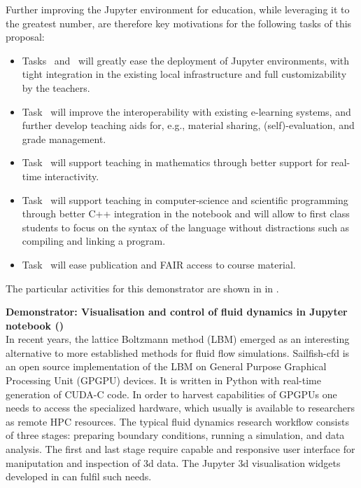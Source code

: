  Further improving the Jupyter environment for education, while
  leveraging it to the greatest number, are therefore key motivations
  for the following tasks of this proposal:
  \begin{itemize}
  \item Tasks~
    and~ will greatly ease the
    deployment of Jupyter environments, with tight integration in the
    existing local infrastructure and full customizability by the
    teachers.
  \item Task~ will improve the
    interoperability with existing e-learning systems, and further
    develop teaching aids for, e.g., material sharing,
    (self)-evaluation, and grade management.
  \item Task~ will support teaching
    in mathematics through better support for real-time interactivity.
  \item Task~ will support teaching
    in computer-science and scientific programming through
    better C++ integration in the notebook and will allow to first class students to focus on the
    syntax of the language without distractions such as compiling and
    linking a program.
  \item Task~ will ease publication and FAIR
    access to course material.
  \end{itemize}

  The particular activities for this demonstrator are shown in
   in .

\medskip
\noindent\textbf{Demonstrator: Visualisation and control of fluid dynamics in
  Jupyter notebook ()}\label{sec:concept-demonstrator-gpu}\\
In recent years, the lattice Boltzmann method (LBM) emerged as an
interesting alternative to more established methods for fluid flow
simulations. Sailfish-cfd \cite{januszewski2014sailfish} is an open
source implementation of the LBM on General Purpose Graphical Processing
Unit (GPGPU) devices. It is written in Python with real-time
generation of CUDA-C code.  In order to harvest capabilities of GPGPUs
one needs to access the specialized hardware, which usually is
available to researchers as remote HPC resources.  The typical fluid
dynamics research workflow consists of three stages: preparing
boundary conditions, running a simulation, and data analysis. The
first and last stage require capable and responsive user interface for
maniputation and inspection of 3d data.  The Jupyter 3d visualisation
widgets developed in  can fulfil
such needs.

